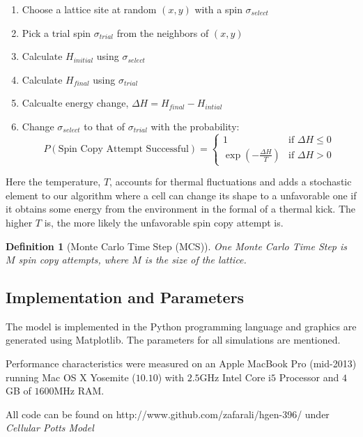 \documentclass[12pt]{article}
\newtheorem{definition}{Definition}
\begin{document}
\begin{enumerate}
  \item Choose a lattice site at random $(x,y)$ with a spin $\sigma_{select}$
  \item Pick a trial spin $\sigma_{trial}$ from the neighbors of $(x,y)$
  \item Calculate $H_{initial}$ using $\sigma_{select}$
  \item Calculate $H_{final}$ using $\sigma_{trial}$
  \item Calcualte energy change, $\Delta H = H_{final} - H_{intial}$
  \item{ Change $\sigma_{select}$ to that of $\sigma_{trial}$ with the probability:
  \begin{equation}
 		P(\text{Spin Copy Attempt Successful}) =
  	\begin{cases}
   		1 & \text{if } \Delta H \leq 0 \\
   		\exp{(-\frac{\Delta H}{T})}       & \text{if } \Delta H > 0
  	\end{cases}
  	\label{p_attempt_success}
	\end{equation}
}
\end{enumerate}

Here the temperature, $T$, accounts for thermal fluctuations and adds a stochastic element to our algorithm where a cell can change its shape to a unfavorable one if it obtains some energy from the environment in the formal of a thermal kick. The higher $T$ is, the more likely the unfavorable spin copy attempt is.

\begin{definition}[Monte Carlo Time Step (MCS)] One Monte Carlo Time Step is $M$ spin copy attempts, where $M$ is the size of the lattice.
\end{definition}

\subsection{Implementation and Parameters}
The model is implemented in the Python programming language and graphics are generated using Matplotlib\cite{matplotlib}. The parameters for all simulations are mentioned.

Performance characteristics were measured on an Apple MacBook Pro (mid-2013) running Mac OS X Yosemite ($10.10$) with $2.5$GHz Intel Core i$5$ Processor and $4$GB of $1600$MHz RAM.

All code can be found on http://www.github.com/zafarali/hgen-396/ under \emph{Cellular Potts Model}
\end{document}
